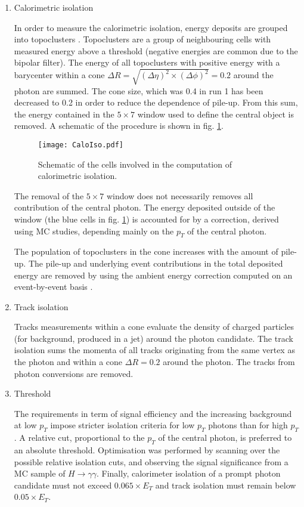 \begin{enumerate}
\item Calorimetric isolation
\label{sec:org1f421d1}

In order to measure the calorimetric isolation, energy deposits are grouped into topoclusters \cite{ATL-LARG-PUB-2008-002}.
Topoclusters are a group of neighbouring cells with measured energy above a threshold (negative energies are common due to the bipolar filter).
The energy of all topoclusters with positive energy with a barycenter within a cone $\Delta R = \sqrt{(\Delta \eta)^2 \times ( \Delta \phi)^2 }=0.2$ around the photon are summed.
The cone size, which was 0.4 in run 1 has been decreased to 0.2 in order to reduce the dependence of pile-up.
From this sum, the energy contained in the \(5\times 7\) window used to define the central object is removed.
A schematic of the procedure is shown in fig. \ref{fig:org3b7cde6}.

\begin{figure}[htbp]
\centering
\texttt{[image: CaloIso.pdf]}
\caption{\label{fig:org3b7cde6}
Schematic of the cells involved in the computation of calorimetric isolation. \cite{ATL-COM-PHYS-2012-467}}
\end{figure}


The removal of the \(5\times 7\) window does not necessarily removes all contribution of the central photon.
The energy deposited outside of the window (the blue cells in fig. \ref{fig:org3b7cde6}) is accounted for by a correction, derived using MC studies,  depending mainly on the $p_T$ of the central photon.

The population of topoclusters in the cone increases with the amount of pile-up.
The pile-up and underlying event contributions in the total deposited energy are removed by using the ambient energy correction computed on an event-by-event basis \cite{ATL-COM-PHYS-2012-467}.


\item Track isolation
  \label{sec:orga378fc3}

Tracks measurements within a cone evaluate the density of charged particles (for background, produced in a jet) around the photon candidate.
The track isolation sums the momenta of all tracks originating from the same vertex as the photon and within a cone \(\Delta R=0.2\) around the photon.
The tracks from photon conversions are removed.

\item Threshold
  \label{sec:org7d75ff3}

The requirements in term of signal efficiency and the increasing background at low $p_T$ impose stricter isolation criteria for low $p_T$ photons than for high $p_T$.
A relative cut, proportional to the $p_T$ of the central photon, is preferred to an absolute threshold.
Optimisation was performed by scanning over the possible relative isolation cuts, and observing the signal significance from a MC sample of \(H\rightarrow\gamma\gamma\).
Finally, calorimeter isolation of a prompt photon candidate must not exceed \(0.065\times E_T\) and track isolation must remain below \(0.05\times E_T\).

\end{enumerate}

